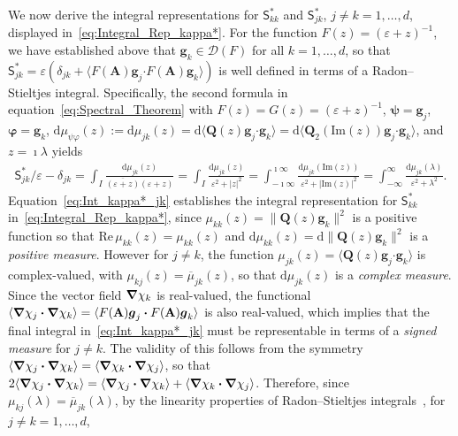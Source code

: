 \documentclass[leqno,onefignum,onetabnum]{siamltex1213}
\renewcommand{\d}{\mathrm{d}}
\newcommand{\Ab}{\mathbf{A}}
\newcommand{\Qb}{\mathbf{Q}}
\newcommand{\Sm}{\mathsf{S}}
\newcommand{\Ds}{\mathscr{D}}
\newcommand\bnabla{\mbox{\boldmath${\nabla}$}}
\providecommand\bcdot{\boldsymbol{\cdot}}
\newcommand{\vecg}{\boldsymbol{g}}
\newcommand{\vecpsi}{\boldsymbol{\psi}}
\newcommand{\vecvarphi}{\boldsymbol{\varphi}}
\begin{document}
We now derive the integral representations for $\Sm^*_{kk}$ and
$\Sm^*_{jk}$, $j\neq k=1,\ldots,d$, displayed
in~\eqref{eq:Integral_Rep_kappa*}. For the function $F(z)=(\varepsilon+z)^{-1}$,
we 
have established above that $\vecg_k\in\Ds(F)$ for all
$k=1,\ldots,d$, so that
$\Sm^*_{jk}=\varepsilon(\delta_{jk}+\langle F(\Ab)\vecg_j\bcdot F(\Ab)\vecg_k\rangle)$ is well defined
in terms of a Radon--Stieltjes integral. Specifically, the second
formula in equation~\eqref{eq:Spectral_Theorem} with
$F(z)=G(z)=(\varepsilon+z)^{-1}$, $\vecpsi=\vecg_j$, $\vecvarphi=\vecg_k$,
$\d\mu_{\psi\varphi}(z):=\d\mu_{jk}(z)=\d\langle\Qb(z)\vecg_j\bcdot\vecg_k\rangle
=\d\langle\Qb_2(\text{Im}(z))\vecg_j\bcdot\vecg_k\rangle$, and $z=\imath\lambda$
yields         
%
\begin{align}\label{eq:Int_kappa*_jk}
  \Sm^*_{jk}/\varepsilon-\delta_{jk}
               =\int_I\frac{\d\mu_{jk}(z)}{\overline{(\varepsilon+z)}(\varepsilon+z)}
               =\int_I\frac{\d\mu_{jk}(z)}{\varepsilon^2+|z|^2}
               =\int_{-\imath\infty}^{\imath\infty}\frac{\d\mu_{jk}(\text{Im}(z))}{\varepsilon^2+|\text{Im}(z)|^2}
               =\int_{-\infty}^\infty\frac{\d\mu_{jk}(\lambda)}{\varepsilon^2+\lambda^2}.
\end{align}
%
Equation~\eqref{eq:Int_kappa*_jk} establishes the integral
representation for $\Sm^*_{kk}$ in~\eqref{eq:Integral_Rep_kappa*}, since
$\mu_{kk}(z)=\|\Qb(z)\vecg_k\|^2$ is a positive function so that
$\text{Re}\,\mu_{kk}(z)=\mu_{kk}(z)$ and
$\d\mu_{kk}(z)=\d\|\Qb(z)\vecg_k\|^2$ is a \emph{positive 
  measure}. However for $j\neq k$, the function
$\mu_{jk}(z)=\langle\Qb(z)\vecg_j\bcdot\vecg_k\rangle$ is complex-valued, with    
$\mu_{kj}(z)=\overline{\mu}_{jk}(z)$, so that $\d\mu_{jk}(z)$ is a
\emph{complex measure}. Since the vector field $\bnabla \chi_k$ is
real-valued, the 
functional $\langle\bnabla \chi_j\bcdot\bnabla \chi_k\rangle=\langle F(\Ab)\vecg_j\bcdot F(\Ab)\vecg_k\rangle$
is also real-valued, which implies that the final integral
in~\eqref{eq:Int_kappa*_jk} must be representable in terms of a 
\emph{signed measure} for $j\neq k$. The validity of this follows from the
symmetry $\langle\bnabla \chi_j\bcdot\bnabla \chi_k\rangle=\langle\bnabla \chi_k\bcdot\bnabla \chi_j\rangle$, so that
$2\langle\bnabla \chi_j\bcdot\bnabla \chi_k\rangle=\langle\bnabla \chi_j\bcdot\bnabla \chi_k\rangle+\langle\bnabla \chi_k\bcdot\bnabla \chi_j\rangle$. Therefore, since
$\mu_{kj}(\lambda)=\overline{\mu}_{jk}(\lambda)$, by the linearity properties of
Radon--Stieltjes integrals~\cite{Stone:64}, for $j\neq k=1,\ldots,d$,
\end{document}

